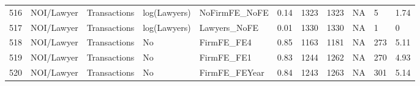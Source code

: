 \begin{table}[ht]
\begin{tabular}{rllllllllll}
  516 & NOI/Lawyer & Transactions & log(Lawyers) & NoFirmFE\_NoFE & 0.14 & 1323 & 1323 & NA & 5 & 1.74 \\ 
  517 & NOI/Lawyer & Transactions & log(Lawyers) & Lawyers\_NoFE & 0.01 & 1330 & 1330 & NA & 1 & 0 \\ 
  518 & NOI/Lawyer & Transactions & No & FirmFE\_FE4 & 0.85 & 1163 & 1181 & NA & 273 & 5.11 \\ 
  519 & NOI/Lawyer & Transactions & No & FirmFE\_FE1 & 0.83 & 1244 & 1262 & NA & 270 & 4.93 \\ 
  520 & NOI/Lawyer & Transactions & No & FirmFE\_FEYear & 0.84 & 1243 & 1263 & NA & 301 & 5.14 \\ 
   \hline
\end{tabular}
\end{table}
